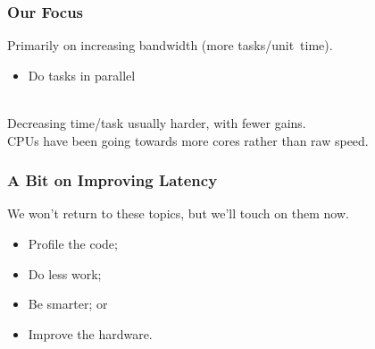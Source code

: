 \begin{frame}
  \frametitle{Our Focus}

\hspace*{.15\textwidth}\begin{minipage}{.8\textwidth}
  Primarily on increasing bandwidth (more tasks/unit~time).
  \begin{itemize}
    \item Do tasks in parallel
  \end{itemize}
~\\[1em]
   Decreasing time/task usually harder, with
          fewer gains.\\[1em]
   CPUs have been going towards more cores rather than raw
          speed.\\[1em]
\end{minipage}

\end{frame}

\begin{frame}
  \frametitle{A Bit on Improving Latency}

\hspace*{.15\textwidth}\begin{minipage}{.85\textwidth}
  We won't return to these topics, but we'll touch on them now.\\

  \begin{itemize}
    \item Profile the code;
    \vfill
    \item Do less work;
    \vfill
    \item Be smarter; or
    \vfill
    \item Improve the hardware.
  \end{itemize}
\end{minipage}

\end{frame}

